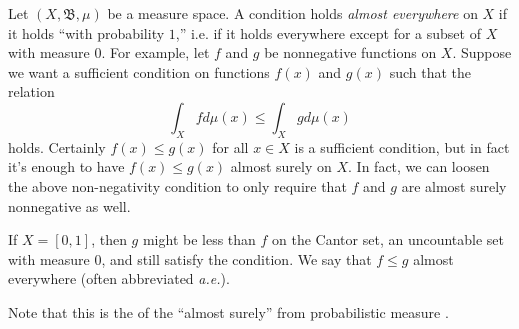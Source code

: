 \documentclass{article}
\newcommand{\borel}{\mathfrak{B}}
\begin{document}
Let $(X, \borel, \mu)$ be a measure space.  A condition holds \emph{almost everywhere} on $X$ if it holds ``with probability $1$,'' i.e. if it holds everywhere except for a subset of $X$ with measure $0$.  For example, let $f$ and $g$ be nonnegative functions on $X$.  Suppose we want a sufficient condition on functions $f(x)$ and $g(x)$ such that the relation
\begin{equation}
\int_{X} f d\mu(x) \le \int_{X} g d\mu(x) 
\end{equation}
holds.  Certainly $f(x)\leq g(x)$ for all $x\in X$ is a sufficient condition, but in fact it's enough to have $f(x)\leq g(x)$ almost surely on $X$.  In fact, we can loosen the above non-negativity condition to only require that $f$ and $g$ are almost surely nonnegative as well.

If $X = [0,1]$, then $g$ might be less than $f$ on the Cantor set, an uncountable set with measure $0$, and still satisfy the condition.  We say that $f \le g$ almost everywhere (often abbreviated \emph{a.e.}).   

Note that this  is the  of the  ``almost surely'' from probabilistic measure .
\end{document}
